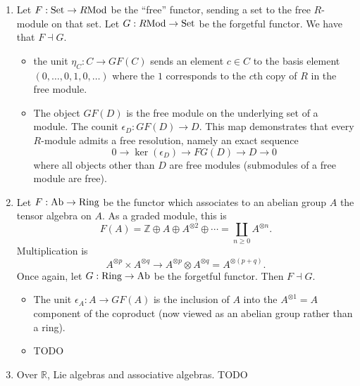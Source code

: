 \documentclass[12pt]{article}
\begin{document}
\begin{example}
	\hfill 
	\begin{enumerate}
		\item Let $F:\text{Set}\to R\text{Mod}$ be the ``free'' functor, sending a set to the free $R$-module on that set. Let $G: R\text{Mod} \to \text{Set}$ be the forgetful functor. We have that $F\dashv G$.
			\begin{itemize}
				\item the unit $\eta_C:C\to GF(C)$ sends an element $c\in C$ to the basis element \break $(0,\dots, 0, 1, 0,\dots)$ where the $1$ corresponds to the $c$th copy of $R$ in the free module.
				\item The object $GF(D)$ is the free module on the underlying set of a module. The counit $\epsilon_D: GF(D)\to D$. This map demonstrates that every $R$-module admits a free resolution, namely an exact sequence 
					\begin{equation*}
						0 \to \ker(\epsilon_D) \to FG(D) \to D \to 0
					\end{equation*}
					where all objects other than $D$ are free modules (submodules of a free module are free).
			\end{itemize}

		\item Let $F:\text{Ab}\to\text{Ring}$ be the functor which associates to an abelian group $A$ the tensor algebra on $A$. As a graded module, this is 
			\begin{equation*}
				F(A)=\mathbb{Z} \oplus A \oplus A^{\otimes 2} \oplus \cdots = \coprod_{n\geq 0}A^{\otimes n}.
			\end{equation*}
			Multiplication is 
			\begin{equation*}
				A^{\otimes p} \times A^{\otimes q} \to A^{\otimes p}\otimes A^{\otimes q}=A^{\otimes (p+q)}.
			\end{equation*}
			Once again, let $G:\text{Ring}\to\text{Ab}$ be the forgetful functor. Then $F\dashv G$.
			\begin{itemize}
				\item The unit $\epsilon_A: A\to GF(A)$ is the inclusion of $A$ into the $A^{\otimes 1}=A$ component of the coproduct (now viewed as an abelian group rather than a ring).
				\item TODO
			\end{itemize}

		\item Over $\mathbb{R}$, Lie algebras and associative algebras. TODO


\end{enumerate}
\end{example}
\end{document}
